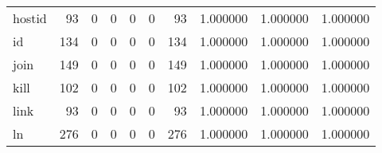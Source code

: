 \begin{tabular}{lrrrrrrrrr}
hostid    &                                                 93 &                                                  0 &                                                  0 &                                                  0 &                                                  0 &                                                 93 &                                           1.000000 &                               1.000000 &                             1.000000 \\
id        &                                                134 &                                                  0 &                                                  0 &                                                  0 &                                                  0 &                                                134 &                                           1.000000 &                               1.000000 &                             1.000000 \\
join      &                                                149 &                                                  0 &                                                  0 &                                                  0 &                                                  0 &                                                149 &                                           1.000000 &                               1.000000 &                             1.000000 \\
kill      &                                                102 &                                                  0 &                                                  0 &                                                  0 &                                                  0 &                                                102 &                                           1.000000 &                               1.000000 &                             1.000000 \\
link      &                                                 93 &                                                  0 &                                                  0 &                                                  0 &                                                  0 &                                                 93 &                                           1.000000 &                               1.000000 &                             1.000000 \\
ln        &                                                276 &                                                  0 &                                                  0 &                                                  0 &                                                  0 &                                                276 &                                           1.000000 &                               1.000000 &                             1.000000 \\

\end{tabular}
